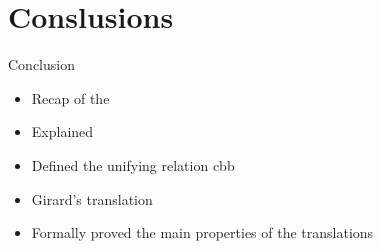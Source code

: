 \documentclass{beamer}
\theoremstyle{definition}
\begin{document}
  \section{Conslusions}
  
  \begin{frame}{Conclusion}
    \begin{itemize}
      \item[\textbullet] Recap of the \lc 
      \item[\textbullet] Explained \lab
      \item[\textbullet] Defined the unifying relation \textsf{cbb}  
      \item[\textbullet] Girard's translation
      \item[\textbullet] Formally proved the main properties of the translations    
    \end{itemize}
  \end{frame}


\end{document}

